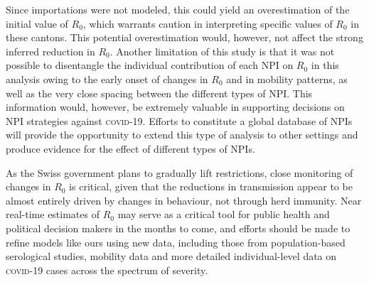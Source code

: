   Since importations were not modeled, this could yield an overestimation of the initial value of $R_0$, which warrants caution in interpreting specific values of $R_0$ in these cantons. This potential overestimation would, however, not affect the strong inferred reduction in $R_0$. Another limitation of this study is that it was not possible to disentangle the individual contribution of each NPI on $R_0$ in this analysis owing to the early onset of changes in $R_0$ and in mobility patterns, as well as the very close spacing between the different types of NPI. This information would, however, be extremely valuable in supporting decisions on NPI strategies against \textsc{covid}-19. Efforts to constitute a global database of NPIs will provide the opportunity to extend this type of analysis to other settings and produce evidence for the effect of different types of NPIs\cite{HITCOVIDTeam:HealthInterventionsTracking:2020}. 
  
  As the Swiss government plans to gradually lift restrictions, close monitoring of changes in $R_0$ is critical, given that the reductions in transmission appear to be almost entirely driven by changes in behaviour, not through herd immunity. Near real-time estimates of $R_0$ may serve as a critical tool for public health and political decision makers in the months to come, and efforts should be made to refine models like ours using new data, including those from population-based serological studies, mobility data and more detailed individual-level data on \textsc{covid}-19 cases across the spectrum of severity.

